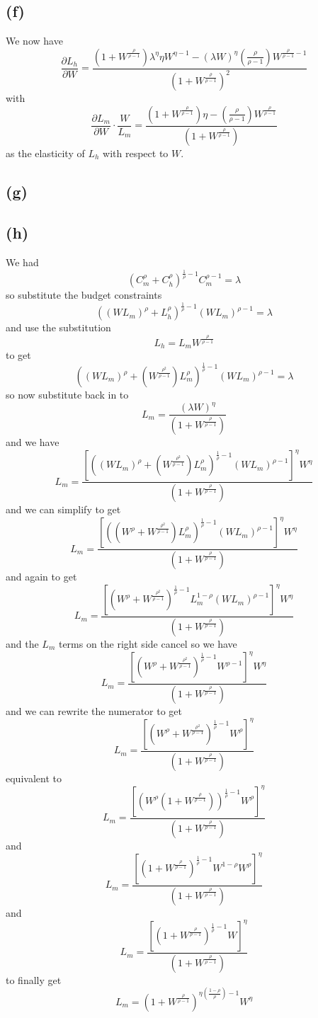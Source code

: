 \documentclass[11pt]{amsart}
\begin{document}
\subsection*{(f)}

We now have
\[
\frac{\partial L_h}{\partial W} = \frac{(1 + W^{\frac{\rho}{\rho-1}}) \lambda^{\eta} \eta W^{\eta - 1} - (\lambda W)^{\eta} (\frac{\rho}{\rho-1}) W^{\frac{\rho}{\rho-1} - 1}}{(1 + W^{\frac{\rho}{\rho-1}})^2}
\]
with 
\[
\frac{\partial L_m}{\partial W} \cdot \frac{W}{L_m} = \frac{(1 + W^{\frac{\rho}{\rho-1}}) \eta  -  (\frac{\rho}{\rho-1}) W^{\frac{\rho}{\rho-1}}}{(1 + W^{\frac{\rho}{\rho-1}})}
\]
as the elasticity of $L_h$ with respect to $W$.

\subsection*{(g)}


\subsection*{(h)}

We had
\[
\left( C_m^\rho + C_h^\rho \right)^{\frac{1}{\rho} -1}  C_m^{\rho-1} = \lambda
\]
so substitute the budget constraints
\[
((W L_m)^{\rho} + L_h^{\rho})^{\frac{1}{\rho} -1} (W L_m)^{\rho-1} = \lambda
\]
and use the substitution
\[
L_h = L_m W^{\frac{\rho}{\rho-1}}
\]
to get
\[
((W L_m)^{\rho} + ( W^{\frac{\rho^2}{\rho-1}}) L_m^{\rho})^{\frac{1}{\rho} -1} (W L_m)^{\rho-1} = \lambda
\]
so now substitute back in to
\[
L_m = \frac{(\lambda W)^{\eta}}{(1 + W^{\frac{\rho}{\rho-1}})}
\]
and we have
\[
L_m = \frac{ \left[((W L_m)^{\rho} + ( W^{\frac{\rho^2}{\rho-1}}) L_m^{\rho})^{\frac{1}{\rho} -1} (W L_m)^{\rho-1}\right]^{\eta} W^{\eta}}{(1 + W^{\frac{\rho}{\rho-1}})}
\]
and we can simplify to get
\[
L_m = \frac{ \left[((W^{\rho} + W^{\frac{\rho^2}{\rho-1}}) L_m^{\rho})^{\frac{1}{\rho} -1} (W L_m)^{\rho-1}\right]^{\eta} W^{\eta}}{(1 + W^{\frac{\rho}{\rho-1}})}
\]
and again to get
\[
L_m = \frac{ \left[(W^{\rho} + W^{\frac{\rho^2}{\rho-1}})^{\frac{1}{\rho} -1} L_m^{1-\rho} (W L_m)^{\rho-1}\right]^{\eta} W^{\eta}}{(1 + W^{\frac{\rho}{\rho-1}})}
\]
and the $L_m$ terms on the right side cancel so we have
\[
L_m = \frac{ \left[(W^{\rho} + W^{\frac{\rho^2}{\rho-1}})^{\frac{1}{\rho} -1}  W ^{\rho-1}\right]^{\eta} W^{\eta}}{(1 + W^{\frac{\rho}{\rho-1}})}
\]
and we can rewrite the numerator to get
\[
L_m = \frac{ \left[(W^{\rho} + W^{\frac{\rho^2}{\rho-1}})^{\frac{1}{\rho} -1}  W ^{\rho}\right]^{\eta} }{(1 + W^{\frac{\rho}{\rho-1}})}
\] 
equivalent to 
\[
L_m = \frac{ \left[(W^{\rho}(1 + W^{\frac{\rho}{\rho-1}}))^{\frac{1}{\rho} -1}  W ^{\rho}\right]^{\eta} }{(1 + W^{\frac{\rho}{\rho-1}})}
\] 
and
\[
L_m = \frac{ \left[(1 + W^{\frac{\rho}{\rho-1}})^{\frac{1}{\rho} -1}  W^{1-\rho} W ^{\rho}\right]^{\eta} }{(1 + W^{\frac{\rho}{\rho-1}})}
\] 
and
\[
L_m = \frac{ \left[(1 + W^{\frac{\rho}{\rho-1}})^{\frac{1}{\rho} -1}  W \right]^{\eta} }{(1 + W^{\frac{\rho}{\rho-1}})}
\] 
to finally get
\[
L_m = \left( 1 + W^{\frac{\rho}{\rho-1}} \right)^{\eta \left( \frac{1-\rho}{\rho} \right) -1} W^\eta
\]
\end{document}
